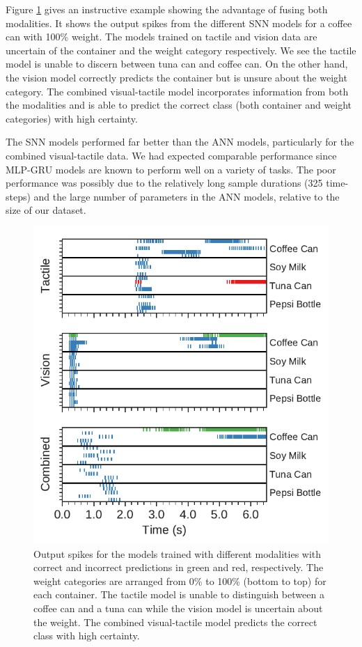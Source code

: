 \documentclass[fyp]{socreport}
\begin{document}
Figure \ref{fig:spikeclass} gives an instructive example showing the advantage
of fusing both modalities. It shows the output spikes from the different SNN
models for a coffee can with 100\% weight. The models trained on tactile and
vision data are uncertain of the container and the weight category respectively.
We see the tactile model is unable to discern between tuna can and coffee can.
On the other hand, the vision model correctly predicts the container but is
unsure about the weight category. The combined visual-tactile model incorporates
information from both the modalities and is able to predict the correct class
(both container and weight categories) with high certainty.

The SNN models performed far better than the ANN models, particularly for the
combined visual-tactile data. We had expected comparable performance since
MLP-GRU models are known to perform well on a variety of tasks. The poor
performance was possibly due to the relatively long sample durations (325
time-steps) and the large number of parameters in the ANN models, relative to
the size of our dataset.

\begin{figure}
\centering
\includegraphics[width=0.80\columnwidth]{images/analysis/spike_class_output.pdf}
\caption{Output spikes for the models trained with different modalities with
  correct and incorrect predictions in green and red, respectively. The weight
  categories are arranged from 0\% to 100\% (bottom to top) for each container.
  The tactile model is unable to distinguish between a coffee can and a tuna can
  while the vision model is uncertain about the weight. The combined
  visual-tactile model predicts the correct class with high certainty.}
\label{fig:spikeclass}
\end{figure}
\end{document}
